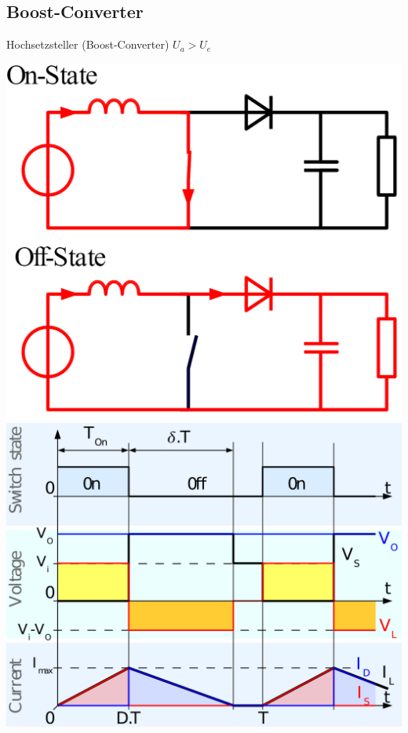 \subsection{Boost-Converter}
\begin{minipage}{0.75\linewidth}
    Hochsetzsteller (Boost-Converter) $U_a > U_e  $\newline
    
\end{minipage}
\begin{minipage}{0.25\linewidth}
    \includegraphics[width=\linewidth]{images/BoostOnOff}
    \includegraphics[width=\linewidth]{images/BoostSwitch}
\end{minipage}



